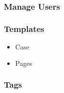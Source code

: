 

\subsubsection{Manage Users}


\newpage

\subsubsection{Templates}
\begin{itemize}
    \item Case
    
    \item Pages
    
\end{itemize}
\newpage

\subsubsection{Tags}
